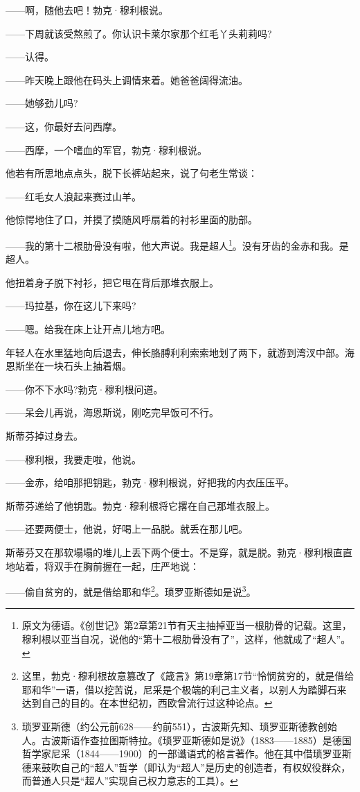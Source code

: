 \par ——啊，随他去吧！勃克·穆利根说。
\par ——下周就该受熬煎了。你认识卡莱尔家那个红毛丫头莉莉吗?
\par ——认得。
\par ——昨天晚上跟他在码头上调情来着。她爸爸阔得流油。
\par ——她够劲儿吗?
\par ——这，你最好去问西摩。
\par ——西摩，一个嗜血的军官，勃克·穆利根说。
\par 他若有所思地点点头，脱下长裤站起来，说了句老生常谈：
\par ——红毛女人浪起来赛过山羊。
\par 他惊愕地住了口，并摸了摸随风呼扇着的衬衫里面的肋部。
\par ——我的第十二根肋骨没有啦，他大声说。我是超人\footnote{原文为德语。《创世记》第2章第21节有天主抽掉亚当一根肋骨的记载。这里，穆利根以亚当自况，说他的“第十二根肋骨没有了”，这样，他就成了“超人”。}。没有牙齿的金赤和我。是超人。
\par 他扭着身子脱下衬衫，把它甩在背后那堆衣服上。
\par ——玛拉基，你在这儿下来吗?
\par ——嗯。给我在床上让开点儿地方吧。
\par 年轻人在水里猛地向后退去，伸长胳膊利利索索地划了两下，就游到湾汊中部。海恩斯坐在一块石头上抽着烟。
\par ——你不下水吗?勃克·穆利根问道。
\par ——呆会儿再说，海恩斯说，刚吃完早饭可不行。
\par 斯蒂芬掉过身去。
\par ——穆利根，我要走啦，他说。
\par ——金赤，给咱那把钥匙，勃克·穆利根说，好把我的内衣压压平。
\par 斯蒂芬递给了他钥匙。勃克·穆利根将它撂在自己那堆衣服上。
\par ——还要两便士，他说，好喝上一品脱。就丢在那儿吧。
\par 斯蒂芬又在那软塌塌的堆儿上丢下两个便士。不是穿，就是脱。勃克·穆利根直直地站着，将双手在胸前握在一起，庄严地说：
\par ——偷自贫穷的，就是借给耶和华\footnote{这里，勃克·穆利根故意篡改了《箴言》第19章第17节“怜悯贫穷的，就是借给耶和华”一语，借以挖苦说，尼采是个极端的利己主义者，以别人为踏脚石来达到自己的目的。在本世纪初，西欧曾流行过这种论点。}。琐罗亚斯德如是说\footnote{琐罗亚斯德（约公元前628——约前551），古波斯先知、琐罗亚斯德教创始人。古波斯语作查拉图斯特拉。《琐罗亚斯德如是说》（1883——1885）是德国哲学家尼采（1844——1900）的一部谶语式的格言著作。他在其中借琐罗亚斯德来鼓吹自己的“超人”哲学（即认为“超人”是历史的创造者，有权奴役群众，而普通人只是“超人”实现自己权力意志的工具）。}。
